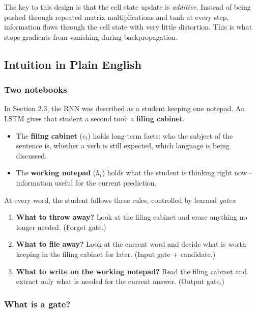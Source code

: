 The key to this design is that the cell state update is \textit{additive}. Instead of
being pushed through repeated matrix multiplications and tanh at every step, information
flows through the cell state with very little distortion. This is what stops gradients
from vanishing during backpropagation.

\subsection{Intuition in Plain English}

\subsubsection{Two notebooks}

In Section 2.3, the RNN was described as a student keeping one notepad. An LSTM
gives that student a second tool: a \textbf{filing cabinet}.

\begin{itemize}
    \item The \textbf{filing cabinet} ($c_t$) holds long-term facts: who the subject
    of the sentence is, whether a verb is still expected, which language is being
    discussed.
    \item The \textbf{working notepad} ($h_t$) holds what the student is thinking
    right now -- information useful for the current prediction.
\end{itemize}

At every word, the student follows three rules, controlled by learned \textit{gates}:

\begin{enumerate}
    \item \textbf{What to throw away?} Look at the filing cabinet and erase anything
    no longer needed. (Forget gate.)
    \item \textbf{What to file away?} Look at the current word and decide what is
    worth keeping in the filing cabinet for later. (Input gate + candidate.)
    \item \textbf{What to write on the working notepad?} Read the filing cabinet and
    extract only what is needed for the current answer. (Output gate.)
\end{enumerate}

\subsubsection{What is a gate?}

